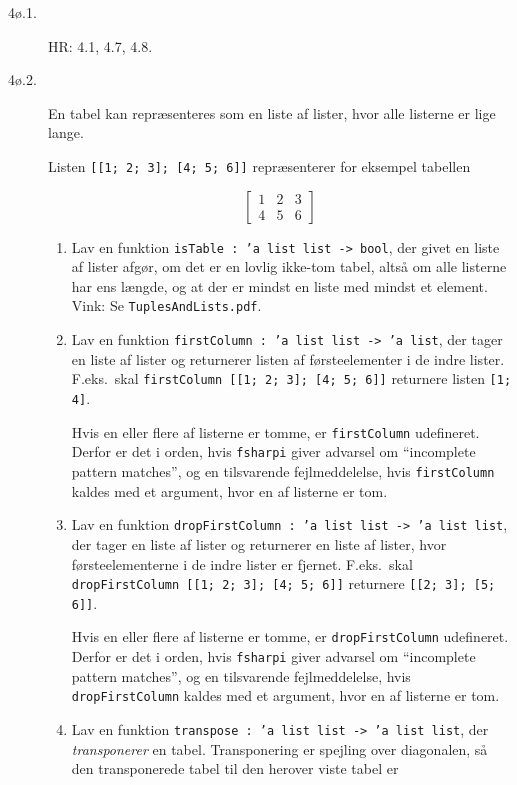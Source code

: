 \documentclass[a4paper]{article}
\begin{document}
\begin{description}
\item[4ø.1.] HR: 4.1, 4.7, 4.8.

\item[4ø.2.] En tabel kan repræsenteres som en liste af lister, hvor alle
  listerne er lige lange.

Listen \texttt{[[1; 2; 3]; [4; 5; 6]]} repræsenterer for eksempel tabellen

\[\left [\begin{array}{rrr}
1 & 2 & 3 \\
4 & 5 & 6
\end{array}
\right ]\]

\begin{enumerate}[i]
\item Lav en funktion \texttt{isTable : 'a list list -> bool}, der
  givet en liste af lister afgør, om det er en lovlig ikke-tom tabel,
  altså om alle listerne har ens længde, og at der er mindst en liste
  med mindst et element.  Vink: Se \texttt{TuplesAndLists.pdf}.

\item Lav en funktion \texttt{firstColumn : 'a list list -> 'a list},
  der tager en liste af lister og returnerer listen af førsteelementer
  i de indre lister.  F.eks.\ skal \texttt{firstColumn [[1; 2; 3]; [4;
        5; 6]]} returnere listen \texttt{[1; 4]}.

  Hvis en eller flere af listerne er tomme, er \texttt{firstColumn}
  udefineret.  Derfor er det i orden, hvis  \texttt{fsharpi} giver
  advarsel om ``incomplete pattern matches'', og en tilsvarende
  fejlmeddelelse, hvis \texttt{firstColumn} kaldes med et
  argument, hvor en af listerne er tom.


\item Lav en funktion \texttt{dropFirstColumn : 'a list list -> 'a
  list list}, der tager en liste af lister og returnerer en liste af
  lister, hvor førsteelementerne i de indre lister er fjernet.
  F.eks.\ skal \texttt{dropFirstColumn [[1; 2; 3]; [4; 5; 6]]}
  returnere \texttt{[[2; 3]; [5; 6]]}.

  Hvis en eller flere af listerne er tomme, er \texttt{dropFirstColumn}
  udefineret.  Derfor er det i orden, hvis  \texttt{fsharpi} giver
  advarsel om ``incomplete pattern matches'', og en tilsvarende
  fejlmeddelelse, hvis \texttt{dropFirstColumn} kaldes med et
  argument, hvor en af listerne er tom.

\item Lav en funktion \texttt{transpose : 'a list list -> 'a list
  list}, der \emph{transponerer} en tabel.  Transponering er spejling over
  diagonalen, så den transponerede tabel til den herover viste tabel er


\end{enumerate}
\end{description}
\end{document}
